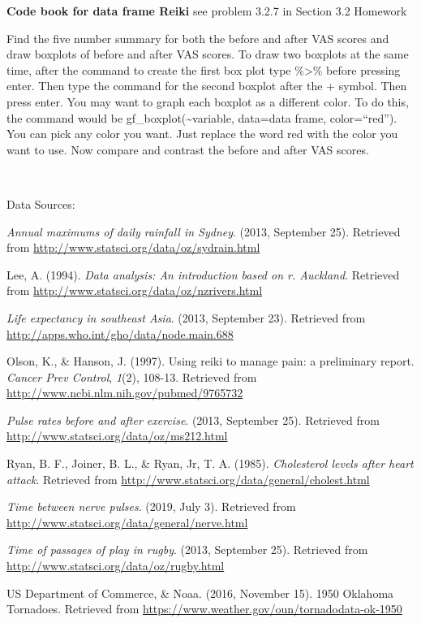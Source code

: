 \documentclass[]{book}
\begin{document}
\textbf{Code book for data frame Reiki} see problem 3.2.7 in Section 3.2 Homework

Find the five number summary for both the before and after VAS scores and draw boxplots of before and after VAS scores. To draw two boxplots at the same time, after the command to create the first box plot type \%\textgreater{}\% before pressing enter. Then type the command for the second boxplot after the + symbol. Then press enter. You may want to graph each boxplot as a different color. To do this, the command would be gf\_boxplot(\textasciitilde{}variable, data=data frame, color=``red''). You can pick any color you want. Just replace the word red with the color you want to use.
Now compare and contrast the before and after VAS scores.

\textbf{\\
}

Data Sources:

\emph{Annual maximums of daily rainfall in Sydney}. (2013, September 25).
Retrieved from \url{http://www.statsci.org/data/oz/sydrain.html}

Lee, A. (1994). \emph{Data analysis: An introduction based on r. Auckland}.
Retrieved from \url{http://www.statsci.org/data/oz/nzrivers.html}

\emph{Life expectancy in southeast Asia}. (2013, September 23). Retrieved
from \url{http://apps.who.int/gho/data/node.main.688}

Olson, K., \& Hanson, J. (1997). Using reiki to manage pain: a
preliminary report. \emph{Cancer Prev Control}, \emph{1}(2), 108-13. Retrieved
from \url{http://www.ncbi.nlm.nih.gov/pubmed/9765732}

\emph{Pulse rates before and after exercise}. (2013, September 25). Retrieved
from \url{http://www.statsci.org/data/oz/ms212.html}

Ryan, B. F., Joiner, B. L., \& Ryan, Jr, T. A. (1985). \emph{Cholesterol
levels after heart attack}. Retrieved from
\url{http://www.statsci.org/data/general/cholest.html}

\emph{Time between nerve pulses}. (2019, July 3). Retrieved from
\url{http://www.statsci.org/data/general/nerve.html}

\emph{Time of passages of play in rugby}. (2013, September 25). Retrieved
from \url{http://www.statsci.org/data/oz/rugby.html}

US Department of Commerce, \& Noaa. (2016, November 15). 1950 Oklahoma Tornadoes. Retrieved from \url{https://www.weather.gov/oun/tornadodata-ok-1950}
\end{document}
